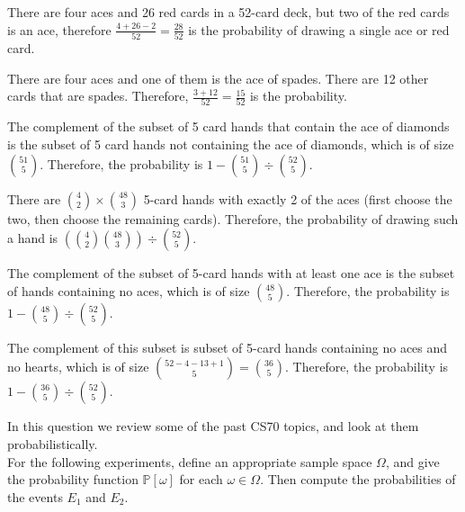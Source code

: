 \documentclass[11pt]{article}
\begin{document}
\begin{solution}

\begin{Parts}
\Part There are four aces and 26 red cards in a 52-card deck, but two of the red
cards is an ace, therefore $\frac{4 + 26 - 2}{52} = \frac{28}{52}$ is the 
probability of drawing a single ace or red card. 

\Part There are four aces and one of them is the ace of spades. There are 12 
other cards that are spades. Therefore, $\frac{3 + 12}{52} = \frac{15}{52}$
is the probability.

\Part The complement of the subset of 5 card hands that contain the ace of 
diamonds is the subset of 5 card hands not containing the ace of diamonds, 
which is of size $\binom{51}{5}$. Therefore, the probability is $1 - 
\binom{51}{5} \div \binom{52}{5}$. 

\Part There are $\binom{4}{2} \times \binom{48}{3}$ 5-card hands with exactly 2 
of the aces (first choose the two, then choose the remaining cards). Therefore,
the probability of drawing such a hand is $\left( \binom{4}{2} \binom{48}{3}
\right) \div \binom{52}{5}$. 

\Part The complement of the subset of 5-card hands with at least one ace is the
subset of hands containing no aces, which is of size $\binom{48}{5}$. Therefore,
the probability is $1 - \binom{48}{5} \div \binom{52}{5}$.

\Part The complement of this subset is subset of 5-card hands containing no aces
and no hearts, which is of size $\binom{52 - 4 - 13 + 1}{5} = \binom{36}{5}$.
Therefore, the probability is $1 - \binom{36}{5} \div \binom{52}{5}$.

\end{Parts}

\end{solution}

In this question we review some of the past CS70 topics, and look at them 
probabilistically.
\\ 
For the following experiments, define an appropriate sample space $\Omega$, and
give the probability function $\mathbb P[\omega]$ for each $\omega \in \Omega$. 
Then compute the probabilities of the events $E_1$ and $E_2$. 
\\
\end{document}
